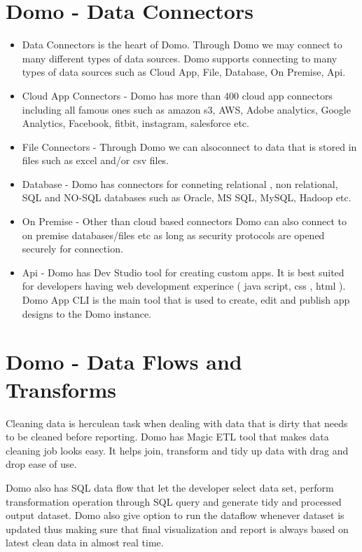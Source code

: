 \section{Domo - Data Connectors}
\begin{itemize}
\item Data Connectors is the heart of Domo. Through Domo we may 
connect to many different types of data sources. Domo supports 
connecting to many types of data sources such as  Cloud App, 
File, Database, On Premise, Api.

\item Cloud App Connectors - Domo has  more than 400 cloud app 
connectors including all famous ones such as amazon s3, 
AWS, Adobe analytics, Google Analytics, Facebook, fitbit, 
instagram, salesforce etc. 

\item File Connectors - Through Domo we can alsoconnect to data 
that is stored in files such as excel and/or csv files.

\item Database - Domo has connectors for conneting relational ,
non relational, SQL and NO-SQL databases such as Oracle, 
MS SQL, MySQL, Hadoop etc.

\item On Premise - Other than cloud based connectors Domo can also 
connect to on premise databases/files etc as long as security 
protocols are opened securely for connection.

\item Api - Domo has Dev Studio tool for creating custom apps. 
It is best suited for developers having web development 
experince ( java script, css , html ). Domo App CLI is the 
main tool that is used to create, edit and publish app designs 
to the Domo instance.
\end{itemize}

\section{Domo - Data Flows and Transforms}

Cleaning data is herculean task when dealing with data that 
is dirty that needs to be cleaned before reporting. Domo has 
Magic ETL tool that makes data cleaning job looks easy. 
It helps join, transform and tidy up data with drag and 
drop ease of use. 

Domo also has SQL data flow that let the developer select 
data set, perform transformation operation through SQL query 
and generate tidy and processed output dataset. Domo also 
give option to run the dataflow whenever dataset is updated 
thus making sure that final visualization and report is 
always based on latest clean data in almost real time.


